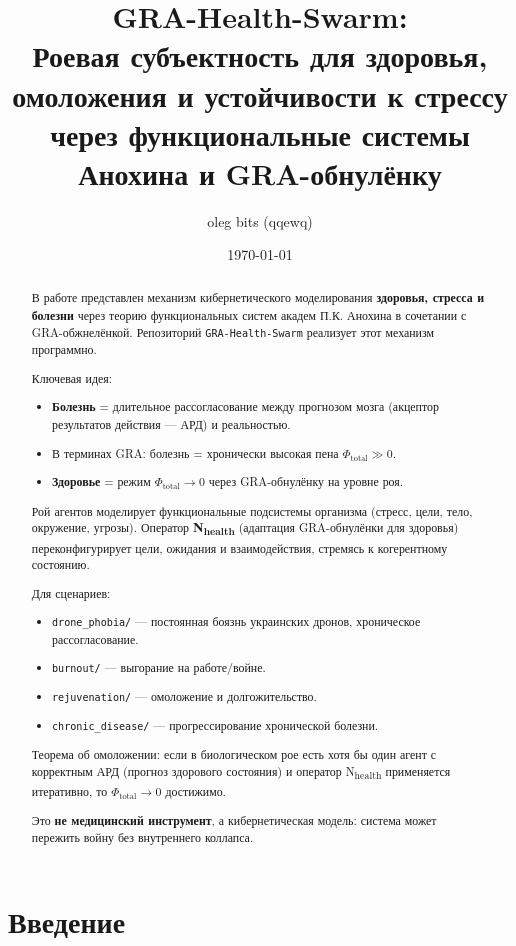 \documentclass[11pt,a4paper]{article}
\title{
  GRA-Health-Swarm: \\
  Роевая субъектность для здоровья, омоложения и устойчивости к стрессу \\
  через функциональные системы Анохина и GRA-обнулёнку
}
\author{oleg bits (qqewq)}
\date{\today}
\begin{document}
\maketitle

\begin{abstract}
В работе представлен механизм кибернетического моделирования \textbf{здоровья, стресса и болезни} через теорию функциональных систем академ П.К. Анохина в сочетании с GRA-обжнелёнкой.
Репозиторий \texttt{GRA-Health-Swarm} реализует этот механизм программно.

Ключевая идея:
\begin{itemize}
  \item \textbf{Болезнь} = длительное рассогласование между прогнозом мозга (акцептор результатов действия — АРД) и реальностью.
  \item В терминах GRA: болезнь = хронически высокая пена $\Phi_{\text{total}} \gg 0$.
  \item \textbf{Здоровье} = режим $\Phi_{\text{total}} \to 0$ через GRA-обнулёнку на уровне роя.
\end{itemize}

Рой агентов моделирует функциональные подсистемы организма (стресс, цели, тело, окружение, угрозы).
Оператор \textbf{N\textsubscript{health}} (адаптация GRA-обнулёнки для здоровья) переконфигурирует цели, ожидания и взаимодействия, стремясь к когерентному состоянию.

Для сценариев:
\begin{itemize}
  \item \texttt{drone\_phobia/} — постоянная боязнь украинских дронов, хроническое рассогласование.
  \item \texttt{burnout/} — выгорание на работе/войне.
  \item \texttt{rejuvenation/} — омоложение и долгожительство.
  \item \texttt{chronic\_disease/} — прогрессирование хронической болезни.
\end{itemize}

Теорема об омоложении: если в биологическом рое есть хотя бы один агент с корректным АРД (прогноз здорового состояния) и оператор N\textsubscript{health} применяется итеративно, то $\Phi_{\text{total}} \to 0$ достижимо.

Это \textbf{не медицинский инструмент}, а кибернетическая модель: система может пережить войну без внутреннего коллапса.
\end{abstract}

\section{Введение}
\end{document}
